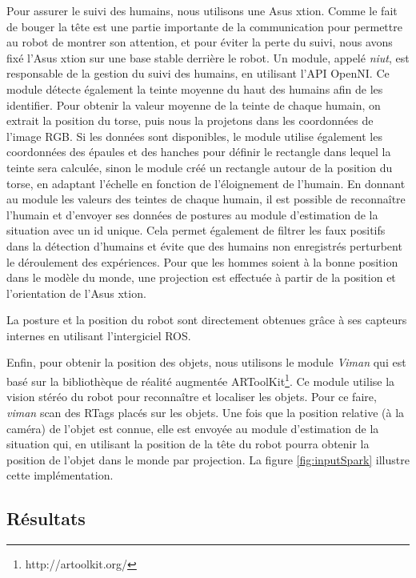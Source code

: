 \documentclass[a4paper,11pt,twoside]{StyleThese}
\begin{document}
Pour assurer le suivi des humains, nous utilisons une Asus xtion. Comme le fait de bouger la tête est une partie importante de la communication pour permettre au robot de montrer son attention, et pour éviter la perte du suivi, nous avons fixé l'Asus xtion sur une base stable derrière le robot.
Un module, appelé \textit{niut}, est responsable de la gestion du suivi des humains, en utilisant l'API OpenNI. Ce module détecte également la teinte moyenne du haut des humains afin de les identifier. Pour obtenir la valeur moyenne de la teinte de chaque humain, on extrait la position du torse, puis nous la projetons dans les coordonnées de l'image RGB. Si les données sont disponibles, le module utilise également les coordonnées des épaules et des hanches pour définir le rectangle dans lequel la teinte sera calculée, sinon le module créé un rectangle autour de la position du torse, en adaptant l'échelle en fonction de l'éloignement de l'humain.
En donnant au module les valeurs des teintes de chaque humain, il est possible de reconnaître l'humain et d'envoyer ses données de postures au module d'estimation de la situation avec un id unique. Cela permet également de filtrer les faux positifs dans la détection d'humains et évite que des humains non enregistrés perturbent le déroulement des expériences.
Pour que les hommes soient à la bonne position dans le modèle du monde, une projection est effectuée à partir de la position et l'orientation de l'Asus xtion.

La posture et la position du robot sont directement obtenues grâce à ses capteurs internes en utilisant l'intergiciel ROS.

Enfin, pour obtenir la position des objets, nous utilisons le module \textit{Viman} qui est basé sur la bibliothèque de réalité augmentée ARToolKit\footnote{http://artoolkit.org/}. Ce module utilise la vision stéréo du robot pour reconnaître et localiser les objets. Pour ce faire, \textit{viman} scan des RTags placés sur les objets.
Une fois que la position relative (à la caméra) de l'objet est connue, elle est envoyée au module d'estimation de la situation qui, en utilisant la position de la tête du robot pourra obtenir la position de l'objet dans le monde par projection.
La figure \ref{fig:inputSpark} illustre cette implémentation.


\subsection{Résultats}
\label{sec:ResChap2}
\end{document}
